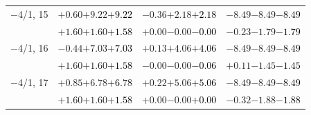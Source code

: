 \documentclass[compress]{beamer}
\begin{document}
\begin{frame}
\begin{tabular}{r | c | c | c}
$-$4/1, 15 & $+0.60$\hspace{0.1 cm}$+9.22$\hspace{0.1 cm}\textcolor{black}{$+9.22$} & $-0.36$\hspace{0.1 cm}$+2.18$\hspace{0.1 cm}\textcolor{black}{$+2.18$} & $-8.49$\hspace{0.1 cm}$-8.49$\hspace{0.1 cm}\textcolor{black}{$-8.49$} \\
           & $+1.60$\hspace{0.1 cm}$+1.60$\hspace{0.1 cm}\textcolor{black}{$+1.58$} & $+0.00$\hspace{0.1 cm}$-0.00$\hspace{0.1 cm}\textcolor{black}{$-0.00$} & $-0.23$\hspace{0.1 cm}$-1.79$\hspace{0.1 cm}\textcolor{black}{$-1.79$} \\
$-$4/1, 16 & $-0.44$\hspace{0.1 cm}$+7.03$\hspace{0.1 cm}\textcolor{black}{$+7.03$} & $+0.13$\hspace{0.1 cm}$+4.06$\hspace{0.1 cm}\textcolor{black}{$+4.06$} & $-8.49$\hspace{0.1 cm}$-8.49$\hspace{0.1 cm}\textcolor{black}{$-8.49$} \\
           & $+1.60$\hspace{0.1 cm}$+1.60$\hspace{0.1 cm}\textcolor{black}{$+1.58$} & $-0.00$\hspace{0.1 cm}$-0.00$\hspace{0.1 cm}\textcolor{black}{$-0.06$} & $+0.11$\hspace{0.1 cm}$-1.45$\hspace{0.1 cm}\textcolor{black}{$-1.45$} \\
$-$4/1, 17 & $+0.85$\hspace{0.1 cm}$+6.78$\hspace{0.1 cm}\textcolor{black}{$+6.78$} & $+0.22$\hspace{0.1 cm}$+5.06$\hspace{0.1 cm}\textcolor{black}{$+5.06$} & $-8.49$\hspace{0.1 cm}$-8.49$\hspace{0.1 cm}\textcolor{black}{$-8.49$} \\
           & $+1.60$\hspace{0.1 cm}$+1.60$\hspace{0.1 cm}\textcolor{black}{$+1.58$} & $+0.00$\hspace{0.1 cm}$-0.00$\hspace{0.1 cm}\textcolor{black}{$+0.00$} & $-0.32$\hspace{0.1 cm}$-1.88$\hspace{0.1 cm}\textcolor{black}{$-1.88$} \\

\end{tabular}
\end{frame}
\end{document}
